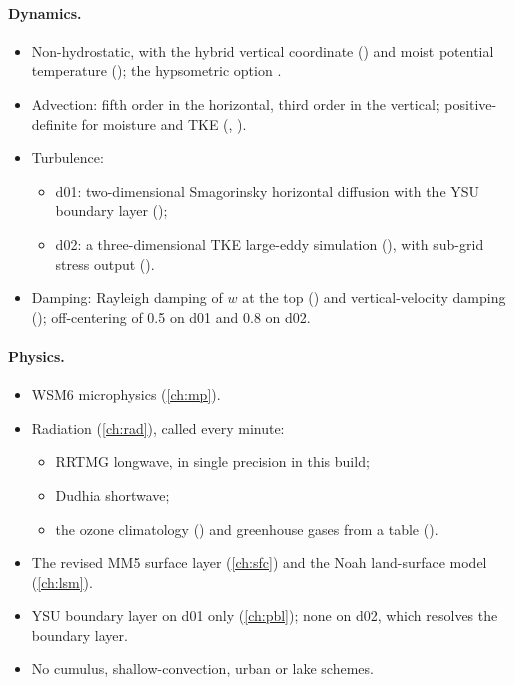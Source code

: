 \paragraph{Dynamics.}
\begin{itemize}
  \item Non-hydrostatic, with the hybrid vertical coordinate () and moist potential
    temperature (); the hypsometric option .
  \item Advection: fifth order in the horizontal, third order in the vertical; positive-definite for moisture and
    TKE (, ).
  \item Turbulence:
    \begin{itemize}
      \item d01: two-dimensional Smagorinsky horizontal diffusion with the YSU boundary layer ();
      \item d02: a three-dimensional TKE large-eddy simulation (), with sub-grid stress output
        ().
    \end{itemize}
  \item Damping: Rayleigh damping of $w$ at the top () and vertical-velocity damping
    (); off-centering  of 0.5 on d01 and 0.8 on d02.
\end{itemize}

\paragraph{Physics.}
\begin{itemize}
  \item WSM6 microphysics (\cref{ch:mp}).
  \item Radiation (\cref{ch:rad}), called every minute:
    \begin{itemize}
      \item RRTMG longwave, in single precision in this build;
      \item Dudhia shortwave;
      \item the ozone climatology () and greenhouse gases from a table ().
    \end{itemize}
  \item The revised MM5 surface layer (\cref{ch:sfc}) and the Noah land-surface model (\cref{ch:lsm}).
  \item YSU boundary layer on d01 only (\cref{ch:pbl}); none on d02, which resolves the boundary layer.
  \item No cumulus, shallow-convection, urban or lake schemes.
\end{itemize}

